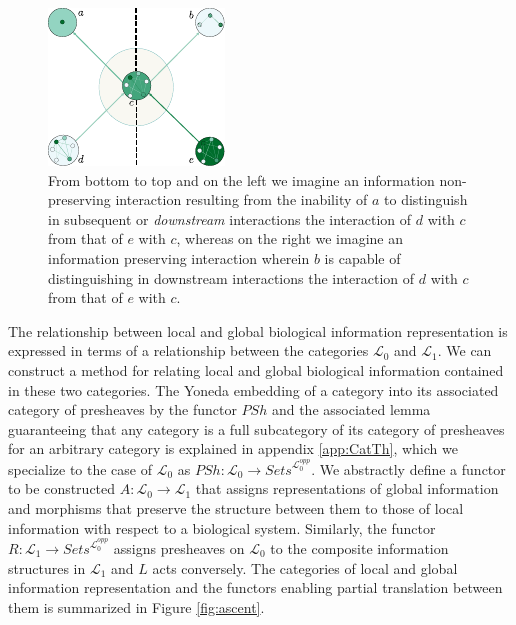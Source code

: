 \documentclass[aps,twocolumn]{revtex4-1}
\begin{document}
\begin{figure}
\noindent\includegraphics[width=0.9\columnwidth]{fig/infopres.pdf}
\caption{From bottom to top and on the left we imagine an information non-preserving interaction resulting from the inability of $a$ to distinguish in subsequent or {\it downstream} interactions the interaction of $d$  with $c$ from that of $e$ with $c$, whereas on the right we imagine an information preserving interaction wherein $b$ is capable of distinguishing in downstream interactions the interaction of $d$  with $c$ from that of $e$ with $c$.}
\label{fig:infopres}
\end{figure}


The relationship between local and global biological information representation is expressed in terms of a relationship between the categories $\mathcal{L}_0$ and $\mathcal{L}_1$. We can construct a method for relating local and global biological information contained in these two categories. The Yoneda embedding of a category into its associated category of presheaves by the functor $PSh$ and the associated lemma guaranteeing that any category is a full subcategory of its category of presheaves for an arbitrary category is explained in appendix \ref{app:CatTh}, which we specialize to the case of $\mathcal{L}_0$ as $PSh: \mathcal{L}_0 \rightarrow \textit{Sets}^{\mathcal{L}_0^{opp}}$. We abstractly define a functor to be constructed $A:\mathcal{L}_0 \rightarrow \mathcal{L}_1$ that assigns representations of global information and morphisms that preserve the structure between them to those of local information with respect to a biological system.  Similarly, the functor $R: \mathcal{L}_1 \rightarrow \textit{Sets}^{\mathcal{L}_0^{opp}}$ assigns presheaves on $\mathcal{L}_0$ to the composite information structures in $\mathcal{L}_1$ and $L$ acts conversely. The categories of local and global information representation and the functors enabling partial translation between them is summarized in Figure \ref{fig:ascent}.
\end{document}
